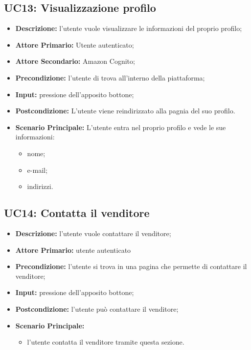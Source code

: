         \subsection{UC13: Visualizzazione profilo}
        \label{sec:UC13}
        \begin{itemize}
            \item \textbf{Descrizione:} l'utente vuole visualizzare le informazioni del proprio profilo;
            \item \textbf{Attore Primario:} Utente autenticato;
            \item \textbf{Attore Secondario:} Amazon Cognito;
            \item \textbf{Precondizione:} l'utente di trova all'interno della piattaforma;
            \item \textbf{Input:} pressione dell'apposito bottone;
            \item \textbf{Postcondizione:} L'utente viene reindirizzato alla pagnia del suo profilo.
            \item \textbf{Scenario Principale:} L'utente entra nel proprio profilo e vede le sue informazioni:
            \begin{itemize}
                \item nome;
                \item e-mail;
                \item indirizzi.
            \end{itemize}
        \end{itemize}

        
        \subsection{UC14: Contatta il venditore}
        \label{sec:UC14}
        \begin{itemize}
            \item \textbf{Descrizione:} l'utente vuole contattare il venditore;
            \item \textbf{Attore Primario:} utente autenticato
            \item \textbf{Precondizione:} l'utente si trova in una pagina che permette di contattare il venditore;
            \item \textbf{Input:} pressione dell'apposito bottone;
            \item \textbf{Postcondizione:} l'utente può contattare il venditore;
            \item \textbf{Scenario Principale:}
            \begin{itemize}
                \item l'utente contatta il venditore tramite questa sezione.
            \end{itemize}
        \end{itemize}

